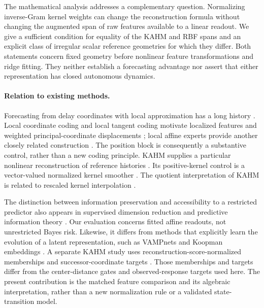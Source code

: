 The mathematical analysis addresses a complementary question. Normalizing inverse-Gram kernel weights can change the reconstruction formula without changing the augmented span of raw features available to a linear readout. We give a sufficient condition for equality of the KAHM and RBF spans and an explicit class of irregular scalar reference geometries for which they differ. Both statements concern fixed geometry before nonlinear feature transformations and ridge fitting. They neither establish a forecasting advantage nor assert that either representation has closed autonomous dynamics.

\paragraph{Relation to existing methods.}
Forecasting from delay coordinates with local approximation has a long history \citep{Farmer1987Prediction}. Local coordinate coding and local tangent coding motivate localized features and weighted principal-coordinate displacements \citep{Yu2009LCC,Yu2010LTC}; local affine experts provide another closely related construction \citep{Jacobs1991Experts}. The position block is consequently a substantive control, rather than a new coding principle. KAHM supplies a particular nonlinear reconstruction of reference histories \citep{Kumar2024KAHM,Kumar2025Collaborative}. Its positive-kernel control is a vector-valued normalized kernel smoother \citep{Nadaraya1964Regression}. The quotient interpretation of KAHM is related to rescaled kernel interpolation \citep{Deparis2014Rescaled,DeMarchi2017Rescaled}.

The distinction between information preservation and accessibility to a restricted predictor also appears in supervised dimension reduction and predictive information theory \citep{Fukumizu2004SDR,Xu2020Usable}. Our evaluation concerns fitted affine readouts, not unrestricted Bayes risk. Likewise, it differs from methods that explicitly learn the evolution of a latent representation, such as VAMPnets and Koopman embeddings \citep{Mardt2018VAMPnets,Lusch2018Embeddings}. A separate KAHM study uses reconstruction-score-normalized memberships and successor-coordinate targets \citep{KumarKargaran2026Limits}. Those memberships and targets differ from the center-distance gates and observed-response targets used here. The present contribution is the matched feature comparison and its algebraic interpretation, rather than a new normalization rule or a validated state-transition model.
